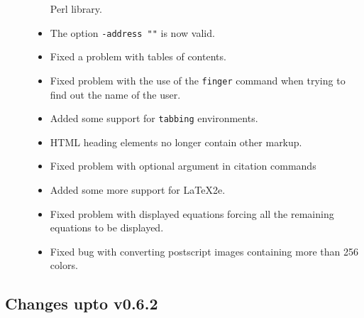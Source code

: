 \begin{description}
\begin{itemize}
Perl library.
\item The option {\tt -address ""} is now valid.
\item Fixed a problem with tables of contents.
\item Fixed problem with the use of the {\tt finger} command when
trying to find out the name of the user.
\item Added some support for {\tt tabbing} environments.
\item HTML heading elements no longer contain other markup.
\item Fixed problem with optional argument in citation commands
\item Added some more support for LaTeX2e.
\item Fixed problem with displayed equations forcing all the remaining
equations to be displayed.
\item Fixed bug with converting postscript images containing more than
256 colors.
\end{itemize}
\end{description}

\subsection{Changes upto v0.6.2}

